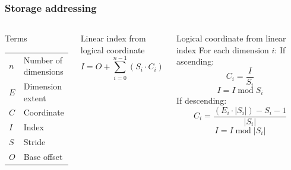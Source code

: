 \documentclass{beamer}
\makeatletter
\newenvironment{conditions}
  {\par\vspace{\abovedisplayskip}\noindent\begin{tabular}{>{$}l<{$} @{${}={}$} l}}
  {\end{tabular}\par\vspace{\belowdisplayskip}}
\makeatother
\begin{document}
\begin{frame}
  \frametitle{Storage addressing}
  \begin{columns}[c]
    \begin{block}{Terms}
    \begin{conditions}
      n & Number of dimensions \\
      E & Dimension extent \\
      C & Coordinate \\
      I & Index \\
      S & Stride \\
      O & Base offset \\
    \end{conditions}
    \end{block}
    \begin{block}{Linear index from logical coordinate}
    \begin{equation*}
      I = O + \sum\limits_{i=0}^{n-1} (S_i \cdot C_i)
    \end{equation*}
    \end{block}
    \begin{block}{Logical coordinate from linear index}
      For each dimension $i$:
      If ascending:
      \begin{equation*}
        C_i = \frac{I}{S_i}
      \end{equation*}
      \begin{equation*}
        I = I \operatorname{mod} S_i
      \end{equation*}
      If descending:
      \begin{equation*}
        C_i = \frac{(E_i \cdot \lvert S_i \rvert) - S_i - 1}{\lvert S_i \rvert}
      \end{equation*}
      \begin{equation*}
        I = I \operatorname{mod} \lvert S_i \rvert
      \end{equation*}
    \end{block}
  \end{columns}
\end{frame}
\end{document}
